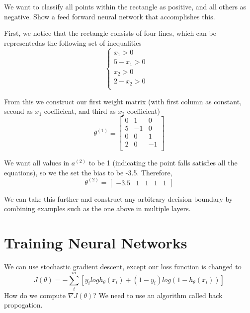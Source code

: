 \begin{example}
    \begin{center}
    \end{center}

    We want to classify all points within the rectangle as positive, and all others as negative. Show a feed forward neural network that accomplishes this. 

    First, we notice that the rectangle consists of four lines, which can be representedas the following set of inequalities
    \begin{equation*}
        \begin{cases}
            x_1 > 0 & \\
            5 - x_1 > 0 & \\
            x_2 > 0 & \\
            2 - x_2 > 0 & \\
        \end{cases}
    \end{equation*}

    From this we construct our first weight matrix (with first column as constant, second as $x_1$ coefficient, and third as $x_2$ coefficient)
    \[ \theta^{(1)} = \begin{bmatrix}
        0 & 1 & 0 \\
        5 & -1 & 0 \\
        0 & 0 & 1 \\
        2 & 0 & -1 \\
    \end{bmatrix} 
    \]

    We want all values in $a^{(2)}$ to be 1 (indicating the point falls satisfies all the equations), so we the set the bias to be -3.5. Therefore,
    \[
        \theta^{(2)} = \begin{bmatrix}
            -3.5 & 1 & 1 & 1 & 1
        \end{bmatrix}
    \]

    We can take this further and construct any arbitrary decision boundary by combining examples such as the one above in multiple layers. 
\end{example}

\section{Training Neural Networks}
We can use stochastic gradient descent, except our loss function is changed to 
\[
    J(\theta)   = -\sum_i^m[y_ilogh_\theta(x_i) + (1-y_i)log(1-h_\theta(x_i))]
\]
How do we compute $\nabla J(\theta)$? We need to use an algorithm called back propogation.

